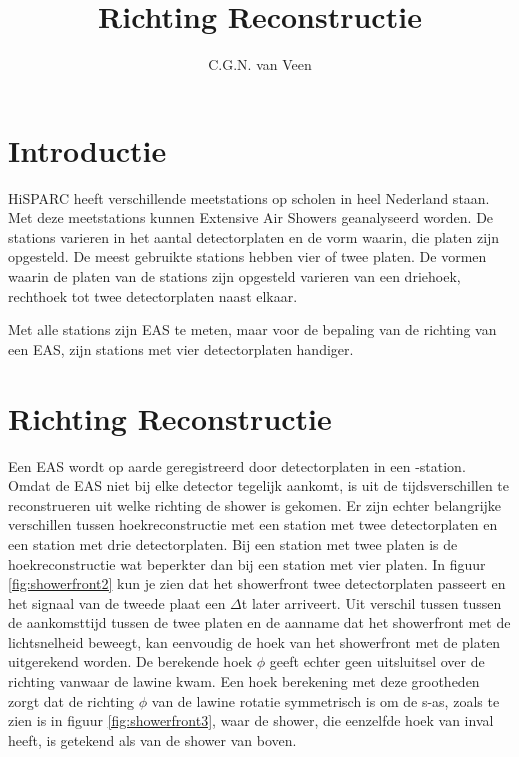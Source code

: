 



\title{Richting Reconstructie}
\author{C.G.N. van Veen} 
\date{}

\maketitle

\section{Introductie}

HiSPARC heeft verschillende meetstations op scholen in heel Nederland staan. 
Met deze meetstations kunnen Extensive Air Showers geanalyseerd worden.
De stations varieren in het aantal detectorplaten en de vorm waarin,
die platen zijn opgesteld. De meest gebruikte stations hebben vier of twee platen.
De vormen waarin de platen van de stations zijn opgesteld varieren van een driehoek,
rechthoek tot twee detectorplaten naast elkaar.

Met alle stations zijn EAS te meten, maar voor de bepaling van de richting van een EAS, zijn 
stations met vier detectorplaten handiger.
  


\section{Richting Reconstructie}

Een EAS wordt op aarde geregistreerd door detectorplaten in een \hisparc-station. 
Omdat de EAS niet bij elke detector tegelijk aankomt, is uit de tijdsverschillen 
te reconstrueren uit welke richting de shower is gekomen. 
Er zijn echter belangrijke verschillen tussen hoekreconstructie met een station met twee detectorplaten en een station met drie detectorplaten. 
Bij een station met twee platen is de hoekreconstructie wat beperkter dan bij een station met vier platen. In figuur \ref{fig:showerfront2} kun je zien dat het showerfront twee detectorplaten passeert en het signaal van de tweede plaat  een $\Delta$t later arriveert. 
Uit verschil tussen tussen de aankomsttijd tussen de twee platen en de aanname dat het showerfront met de lichtsnelheid beweegt,
 kan eenvoudig de hoek van het showerfront met de platen uitgerekend worden. De berekende hoek $\phi$ geeft echter geen uitsluitsel over de richting vanwaar de lawine kwam.
 Een hoek berekening met deze grootheden zorgt dat de richting $\phi$ van de lawine rotatie symmetrisch is om de s-as, zoals te zien is in figuur \ref{fig:showerfront3}, 
waar de shower, die eenzelfde hoek van inval heeft,  is getekend als van de shower van boven. 

